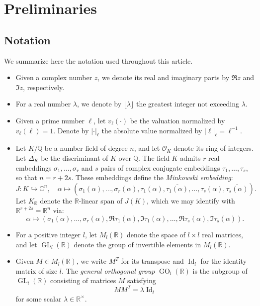 \documentclass[table]{amsart}
\newcommand{\Q}{\mathbb{Q}}
\numberwithin{equation}{section}
\begin{document}
\section{Preliminaries}\label{s 2}
\subsection{Notation}

We summarize here the notation used throughout this article.

\begin{itemize}
\item Given a complex number $z$, we denote its real and imaginary parts by $\Re z$ and $\Im z$, respectively.
\item For a real number $\lambda$, we denote by $\lfloor \lambda \rfloor$ the greatest integer not exceeding $\lambda$. 
\item Given a prime number $\ell$, let $v_\ell(\cdot)$ be the valuation normalized by $v_\ell(\ell)=1$. Denote by $|\cdot|_\ell$ the absolute value normalized by $|\ell|_\ell=\ell^{-1}$.
\item Let $K/\mathbb{Q}$ be a number field of degree $n$, and let $\mathcal{O}_K$ denote its ring of integers. Let $\Delta_K$ be the discriminant of $K$ over $\Q$. The field $K$ admits $r$ real embeddings $\sigma_1, \ldots, \sigma_r$ and $s$ pairs of complex conjugate embeddings $\tau_1, \ldots, \tau_s$, so that $n = r + 2s$. These embeddings define the \emph{Minkowski embedding}:
\[
J : K \hookrightarrow \mathbb{C}^n, \quad \alpha \mapsto \left( \sigma_1(\alpha), \ldots, \sigma_r(\alpha), \tau_1(\alpha), \overline{\tau_1(\alpha)}, \ldots, \tau_s(\alpha), \overline{\tau_s(\alpha)} \right).
\]
Let $K_{\mathbb{R}}$ denote the $\mathbb{R}$-linear span of $J(K)$, which we may identify with $\mathbb{R}^{r+2s}=\mathbb{R}^n$ via:
\[\alpha\mapsto \left( \sigma_1(\alpha), \ldots, \sigma_r(\alpha), \Re\tau_1(\alpha), \Im\tau_1(\alpha), \ldots, \Re\tau_s(\alpha), \Im\tau_s(\alpha)\right).\]

\item For a positive integer $l$, let $M_l(\mathbb{R})$ denote the space of $l \times l$ real matrices, and let $\operatorname{GL}_l(\mathbb{R})$ denote the group of invertible elements in $M_l(\mathbb{R})$.

\item Given $M \in M_l(\mathbb{R})$, we write $M^T$ for its transpose and $\operatorname{Id}_l$ for the identity matrix of size $l$. The \emph{general orthogonal group} $\operatorname{GO}_l(\mathbb{R})$ is the subgroup of $\operatorname{GL}_l(\mathbb{R})$ consisting of matrices $M$ satisfying
\[
M M^T = \lambda \operatorname{Id}_l
\]
for some scalar $\lambda \in \mathbb{R}^\times$.

\end{itemize}
\end{document}

